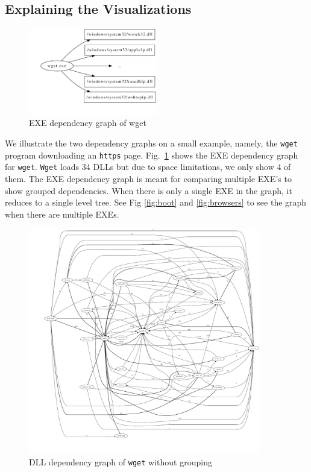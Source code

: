 \subsection{Explaining the Visualizations}

\begin{figure}[tbh]
\centering
\includegraphics[width=0.5\textwidth]{depvis/wget-exe-split.pdf}
\caption{EXE dependency graph of wget}
\label{fig:wget-exe-split}
\end{figure}

We illustrate the two dependency graphs on a small example, namely, the
{\tt wget} program downloading an {\tt https} page.
Fig.~\ref{fig:wget-exe-split} shows the EXE dependency graph for {\tt wget}.
{\tt Wget} loads 34 DLLs but due to space limitations, we only show 4 of them.
The EXE dependency graph is meant for comparing multiple EXE's to show
grouped dependencies.
When there is only a single EXE in the graph, it reduces to a single level
tree. See Fig \ref{fig:boot} and \ref{fig:browsers} to see the graph
when there are multiple EXEs.

\begin{figure}[htb]
\centering
\includegraphics[width=0.9\textwidth]{depvis/wget-nogroup.pdf}
\caption{DLL dependency graph of {\tt wget} without grouping}
\label{fig:wget-nogroup}
\end{figure}

